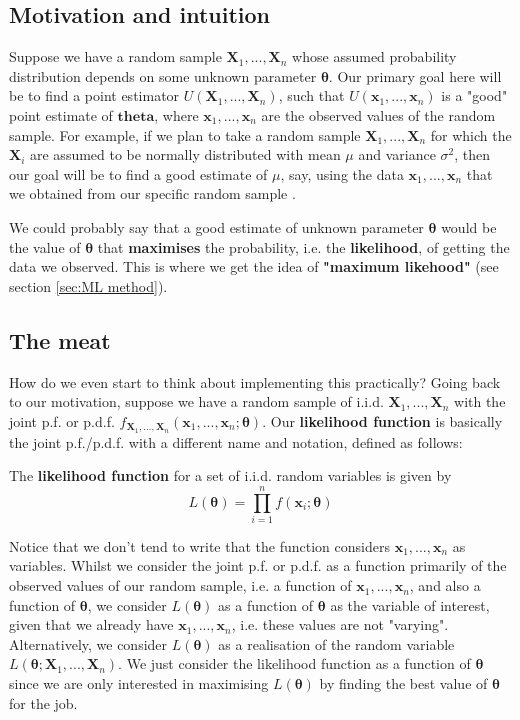 \subsection{Motivation and intuition}
Suppose we have a random sample \(\bm{X}_1,...,\bm{X}_n\) whose assumed probability distribution depends on some unknown parameter \(\bm{\theta}\). 
Our primary goal here will be to find a point estimator \(U(\bm{X}_1,...,\bm{X}_n)\), such that \(U(\bm{x}_1,...,\bm{x}_n)\) is a "good" point estimate of \(\bm{theta}\), where \(\bm{x}_1,...,\bm{x}_n\) are the observed values of the random sample. 
For example, if we plan to take a random sample \(\bm{X}_1,...,\bm{X}_n\) for which the \(\bm{X}_i\) are assumed to be normally distributed with mean \(\mu\) and variance \(\sigma^2\), then our goal will be to find a good estimate of \(\mu\), say, using the data \(\bm{x}_1,...,\bm{x}_n\) that we obtained from our specific random sample \autocite{penn415}.

\bigskip

We could probably say that a good estimate of unknown parameter \(\bm{\theta}\) would be the value of \(\bm{\theta}\) that \textbf{maximises} the probability, i.e. the \textbf{likelihood}, of getting the data we observed. 
This is where we get the idea of \textbf{"maximum likehood"} (see section \ref{sec:ML method}). 

\subsection{The meat}
How do we even start to think about implementing this practically?
Going back to our motivation, suppose we have a random sample of i.i.d. \(\bm{X}_1,...,\bm{X}_n\) with the joint p.f. or p.d.f. \(f_{\bm{X}_1,...,\bm{X}_n}(\bm{x}_1,...,\bm{x}_n;\bm{\theta})\). 
Our \textbf{likelihood function} is basically the joint p.f./p.d.f. with a different name and notation, defined as follows:

\begin{definition}\label{defn:likelihood func}
    The \textbf{likelihood function} for a set of i.i.d. random variables is given by
    \begin{equation}\label{eq:likelihood func}
        L(\bm{\theta}) = \prod_{i=1}^n f(\bm{x}_i;\bm{\theta})
    \end{equation}
\end{definition}

Notice that we don't tend to write that the function considers \(\bm{x}_1,...,\bm{x}_n\) as variables. 
Whilst we consider the joint p.f. or p.d.f. as a function primarily of the observed values of our random sample, i.e. a function of \(\bm{x}_1,...,\bm{x}_n\), and also a function of \(\bm{\theta}\), we consider \(L(\bm{\theta})\) as a function of \(\bm{\theta}\) as the variable of interest, given that we already have \(\bm{x}_1,...,\bm{x}_n\), i.e. these values are not "varying".
Alternatively, we consider \(L(\bm{\theta})\) as a realisation of the random variable \(L(\bm{\theta};\bm{X}_1,...,\bm{X}_n)\).
We just consider the likelihood function as a function of \(\bm{\theta}\) since we are only interested in maximising \(L(\bm{\theta})\) by finding the best value of \(\bm{\theta}\) for the job. 

